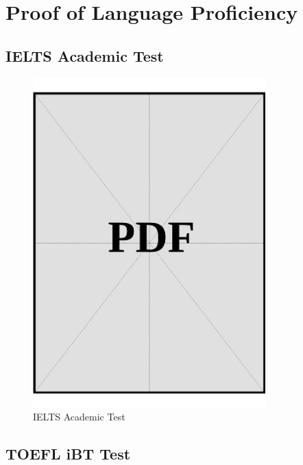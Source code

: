 \chapter{Proof of Language Proficiency}\label{sec:proof-of-language-proficiency}

\section{IELTS Academic Test}\label{sec:ielts}

\begin{figure}[ht]
  \centering
  \includegraphics[page=1, width=0.8\textwidth]{../docs/applicant/language-proficiency/english/ielts.pdf}
  \caption{IELTS Academic Test}
  \label{pdf:ielts-page1}
\end{figure}

\clearpage

\section{TOEFL iBT Test}\label{sec:toefl}

